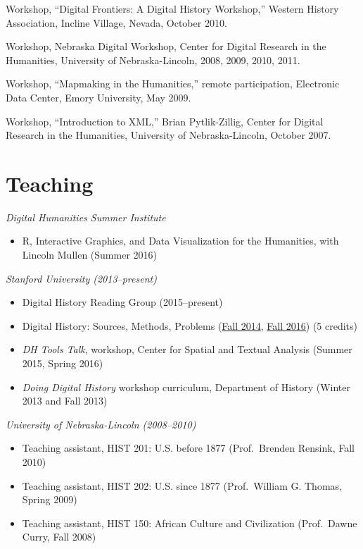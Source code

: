 Workshop, ``Digital Frontiers: A Digital History Workshop,'' Western
History Association, Incline Village, Nevada, October 2010.

Workshop, Nebraska Digital Workshop, Center for Digital Research in the
Humanities, University of Nebraska-Lincoln, 2008, 2009, 2010, 2011.

Workshop, ``Mapmaking in the Humanities,'' remote participation,
Electronic Data Center, Emory University, May 2009.

Workshop, ``Introduction to XML,'' Brian Pytlik-Zillig, Center for
Digital Research in the Humanities, University of Nebraska-Lincoln,
October 2007.

\section{Teaching}\label{teaching}

\emph{Digital Humanities Summer Institute}

\begin{itemize}
\tightlist
\item
  R, Interactive Graphics, and Data Visualization for the Humanities,
  with Lincoln Mullen (Summer 2016)
\end{itemize}

\emph{Stanford University (2013--present)}

\begin{itemize}
\tightlist
\item
  Digital History Reading Group (2015--present)
\item
  Digital History: Sources, Methods, Problems
  (\href{http://jasonheppler.org/teaching/hist205f.2014/}{Fall 2014},
  \href{}{Fall 2016}) (5 credits)
\item
  \emph{DH Tools Talk}, workshop, Center for Spatial and Textual
  Analysis (Summer 2015, Spring 2016)
\item
  \emph{Doing Digital History} workshop curriculum, Department of
  History (Winter 2013 and Fall 2013)
\end{itemize}

\emph{University of Nebraska-Lincoln (2008--2010)}

\begin{itemize}
\tightlist
\item
  Teaching assistant, HIST 201: U.S. before 1877 (Prof.~Brenden Rensink,
  Fall 2010)
\item
  Teaching assistant, HIST 202: U.S. since 1877 (Prof.~William G.
  Thomas, Spring 2009)
\item
  Teaching assistant, HIST 150: African Culture and Civilization
  (Prof.~Dawne Curry, Fall 2008)
\end{itemize}

